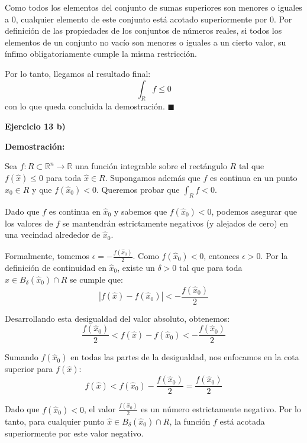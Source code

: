 \documentclass[11pt,letterpaper]{article}
\begin{document}
Como todos los elementos del conjunto de sumas superiores son menores o iguales a $0$, cualquier elemento de este conjunto está acotado superiormente por $0$. Por definición de las propiedades de los conjuntos de números reales, si todos los elementos de un conjunto no vacío son menores o iguales a un cierto valor, su ínfimo obligatoriamente cumple la misma restricción.

Por lo tanto, llegamos al resultado final:
\begin{equation*}
\int_R f \le 0
\end{equation*}
con lo que queda concluida la demostración. \hfill $\blacksquare$

\textbf{Ejercicio 13 b)}

\textbf{Demostración:}

Sea $f: R \subset \mathbb{R}^n \rightarrow \mathbb{R}$ una función integrable sobre el rectángulo $R$ tal que $f(\hat{x}) \le 0$ para toda $\hat{x} \in R$. Supongamos además que $f$ es continua en un punto $\hat{x}_0 \in R$ y que $f(\hat{x}_0) < 0$. Queremos probar que $\int_R f < 0$.

Dado que $f$ es continua en $\hat{x}_0$ y sabemos que $f(\hat{x}_0) < 0$, podemos asegurar que los valores de $f$ se mantendrán estrictamente negativos (y alejados de cero) en una vecindad alrededor de $\hat{x}_0$. 

Formalmente, tomemos $\epsilon = -\frac{f(\hat{x}_0)}{2}$. Como $f(\hat{x}_0) < 0$, entonces $\epsilon > 0$. Por la definición de continuidad en $\hat{x}_0$, existe un $\delta > 0$ tal que para toda $\hat{x} \in B_\delta(\hat{x}_0) \cap R$ se cumple que:
\begin{equation*}
|f(\hat{x}) - f(\hat{x}_0)| < -\frac{f(\hat{x}_0)}{2}
\end{equation*}

Desarrollando esta desigualdad del valor absoluto, obtenemos:
\begin{equation*}
\frac{f(\hat{x}_0)}{2} < f(\hat{x}) - f(\hat{x}_0) < -\frac{f(\hat{x}_0)}{2}
\end{equation*}

Sumando $f(\hat{x}_0)$ en todas las partes de la desigualdad, nos enfocamos en la cota superior para $f(\hat{x})$:
\begin{equation*}
f(\hat{x}) < f(\hat{x}_0) - \frac{f(\hat{x}_0)}{2} = \frac{f(\hat{x}_0)}{2}
\end{equation*}

Dado que $f(\hat{x}_0) < 0$, el valor $\frac{f(\hat{x}_0)}{2}$ es un número estrictamente negativo. Por lo tanto, para cualquier punto $\hat{x} \in B_\delta(\hat{x}_0) \cap R$, la función $f$ está acotada superiormente por este valor negativo.
\end{document}
